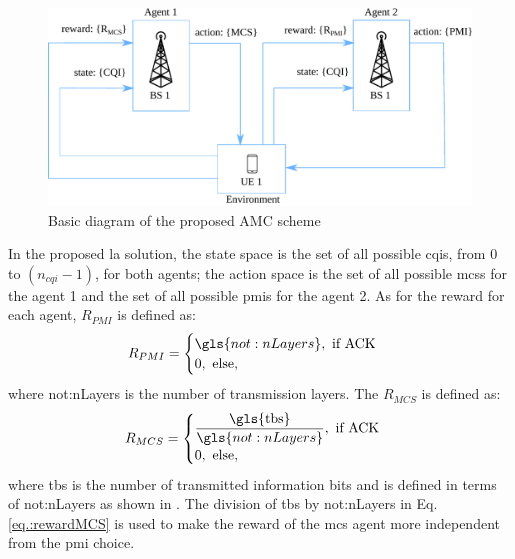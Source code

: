 %
\begin{figure}[!hb]
	\centerline{\includegraphics[width=\columnwidth]{figures/chp_la/rl-framework-mateus.pdf}}
	\caption{Basic diagram of the proposed AMC scheme}
	\label{fig:la-rl-frame}
\end{figure}
%

In the proposed \gls{la} solution, the state space is the set of all possible \gls{cqi}s, from $0$ to $(n_{cqi}-1)$, for both agents; the action space is the set of all possible \gls{mcs}s for the agent 1 and the set of all possible \gls{pmi}s for the agent 2. As for the reward for each agent, $R_{PMI}$ is defined as:
%
\begin{equation}\label{eq.:rewardPMI}
R_{PMI} = \begin{cases}
\gls{not:nLayers}, \text{ if ACK} \\
0, \text{ else,}
\end{cases}
\end{equation}
%
\noindent where \gls{not:nLayers} is the number of transmission layers. The $R_{MCS}$ is defined as:
\begin{equation}\label{eq.:rewardMCS}
R_{MCS} = \begin{cases}
\dfrac{\textrm{\gls{tbs}}}{\gls{not:nLayers}}, \text{ if ACK} \\
0, \text{ else,}
\end{cases}
\end{equation}
\noindent where \gls{tbs} is the number of transmitted information bits and is defined in terms of \gls{not:nLayers} as shown in \cite{3gpp.38.214}.
%
The division of \gls{tbs} by \gls{not:nLayers} in Eq. \eqref{eq.:rewardMCS} is used to make the reward of the \gls{mcs} agent more independent from the \gls{pmi} choice.
%

